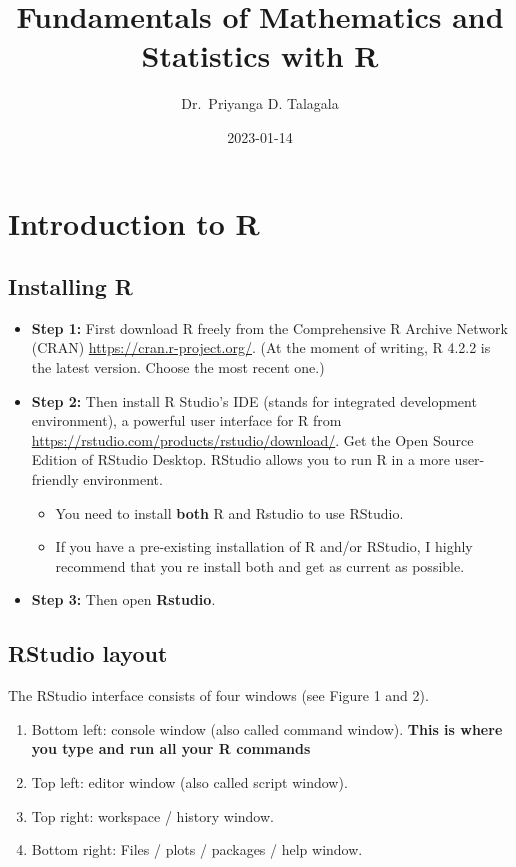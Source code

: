 \documentclass[
]{book}
\title{Fundamentals of Mathematics and Statistics with R}
\author{Dr.~Priyanga D. Talagala}
\date{2023-01-14}
\begin{document}
\maketitle

{
\setcounter{tocdepth}{1}
\tableofcontents
}
\hypertarget{intro}{%
\chapter{Introduction to R}\label{intro}}


\hypertarget{installing-r}{%
\section{Installing R}\label{installing-r}}

\begin{itemize}
\item
  \textbf{Step 1:} First download R freely from the Comprehensive R Archive Network (CRAN) \url{https://cran.r-project.org/}.
  (At the moment of writing, R 4.2.2 is the latest version. Choose the most recent one.)
\item
  \textbf{Step 2:} Then install R Studio's IDE (stands for integrated development environment), a powerful user interface for R from \url{https://rstudio.com/products/rstudio/download/}. Get the Open Source Edition of RStudio Desktop. RStudio allows you to run R in a more user-friendly environment.

  \begin{itemize}
  \item
    You need to install \textbf{both} R and Rstudio to use RStudio.
  \item
    If you have a pre-existing installation of R and/or RStudio, I highly recommend that you re install both and get as current as possible.
  \end{itemize}
\item
  \textbf{Step 3:} Then open \textbf{Rstudio}.
\end{itemize}

\hypertarget{rstudio-layout}{%
\section{RStudio layout}\label{rstudio-layout}}

The RStudio interface consists of four windows (see Figure 1 and 2).

\begin{enumerate}
\def\labelenumi{\arabic{enumi}.}
\item
  Bottom left: console window (also called command window). \textbf{This is where you type and run all your R commands}
\item
  Top left: editor window (also called script window).
\item
  Top right: workspace / history window.
\item
  Bottom right: Files / plots / packages / help window.
\end{enumerate}
\end{document}
